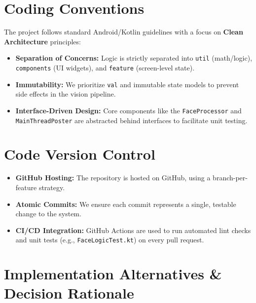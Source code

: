 \documentclass[11pt]{report}
\begin{document}
\section{Coding Conventions}\label{sec:coding-conventions}
The project follows standard Android/Kotlin guidelines with a focus on \textbf{Clean Architecture} principles:

\begin{itemize}
    \item \textbf{Separation of Concerns:} Logic is strictly separated into \texttt{util} (math/logic), \texttt{components} (UI widgets), and \texttt{feature} (screen-level state).
    \item \textbf{Immutability:} We prioritize \texttt{val} and immutable state models to prevent side effects in the vision pipeline.
    \item \textbf{Interface-Driven Design:} Core components like the \texttt{FaceProcessor} and \texttt{MainThreadPoster} are abstracted behind interfaces to facilitate unit testing.
\end{itemize}

\section{Code Version Control}\label{sec:version-control}
\begin{itemize}
    \item \textbf{GitHub Hosting:} The repository is hosted on GitHub, using a branch-per-feature strategy.
    \item \textbf{Atomic Commits:} We ensure each commit represents a single, testable change to the system.
    \item \textbf{CI/CD Integration:} GitHub Actions are used to run automated lint checks and unit tests (e.g., \texttt{FaceLogicTest.kt}) on every pull request.
\end{itemize}

\section{Implementation Alternatives \& Decision Rationale}\label{sec:impl-alternatives}
\end{document}
